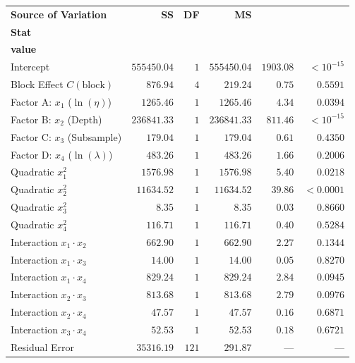 \begin{tabular}{lrrrrr}
\toprule
\textbf{Source of Variation} & \textbf{SS} & \textbf{DF} & \textbf{MS} & \makecell{\textbf{F-}\\\textbf{Stat}} & \makecell{\bm{$p$}\\\textbf{value}} \\
\midrule
Intercept & $555450.04$ & $1$ & $555450.04$ & $1903.08$ & $< 10^{-15}$ \\
Block Effect $C(\text{block})$ & $876.94$ & $4$ & $219.24$ & $0.75$ & $0.5591$ \\
Factor A: $x_1$ ($\ln(\eta)$) & $1265.46$ & $1$ & $1265.46$ & $4.34$ & $0.0394$ \\
Factor B: $x_2$ (Depth) & $236841.33$ & $1$ & $236841.33$ & $811.46$ & $< 10^{-15}$ \\
Factor C: $x_3$ (Subsample) & $179.04$ & $1$ & $179.04$ & $0.61$ & $0.4350$ \\
Factor D: $x_4$ ($\ln(\lambda)$) & $483.26$ & $1$ & $483.26$ & $1.66$ & $0.2006$ \\
Quadratic $x_1^2$ & $1576.98$ & $1$ & $1576.98$ & $5.40$ & $0.0218$ \\
Quadratic $x_2^2$ & $11634.52$ & $1$ & $11634.52$ & $39.86$ & $< 0.0001$ \\
Quadratic $x_3^2$ & $8.35$ & $1$ & $8.35$ & $0.03$ & $0.8660$ \\
Quadratic $x_4^2$ & $116.71$ & $1$ & $116.71$ & $0.40$ & $0.5284$ \\
Interaction $x_1 \cdot x_2$ & $662.90$ & $1$ & $662.90$ & $2.27$ & $0.1344$ \\
Interaction $x_1 \cdot x_3$ & $14.00$ & $1$ & $14.00$ & $0.05$ & $0.8270$ \\
Interaction $x_1 \cdot x_4$ & $829.24$ & $1$ & $829.24$ & $2.84$ & $0.0945$ \\
Interaction $x_2 \cdot x_3$ & $813.68$ & $1$ & $813.68$ & $2.79$ & $0.0976$ \\
Interaction $x_2 \cdot x_4$ & $47.57$ & $1$ & $47.57$ & $0.16$ & $0.6871$ \\
Interaction $x_3 \cdot x_4$ & $52.53$ & $1$ & $52.53$ & $0.18$ & $0.6721$ \\
Residual Error & $35316.19$ & $121$ & $291.87$ & --- & --- \\
\bottomrule
\end{tabular}

